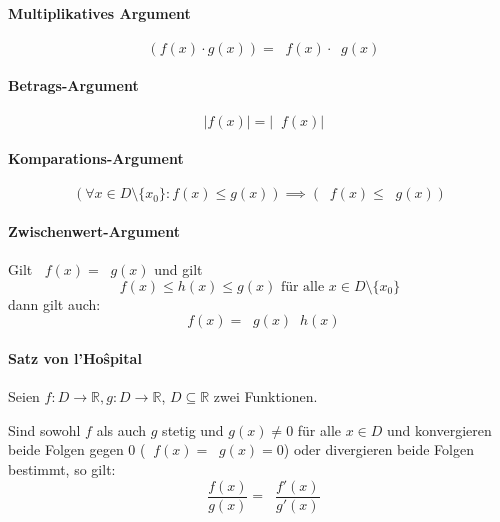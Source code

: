 \documentclass[a4paper, 11pt, accentcolor = tud3b]{tudreport}
\DeclareMathOperator{\limx}{\lim _ { x \rightarrow x _ 0 }}
\begin{document}
            \paragraph{Multiplikatives Argument}
                \[ \limx (f(x) \cdot g(x)) = \limx f(x) \cdot \limx g(x) \]

            \paragraph{Betrags-Argument}
                \[ \limx \lvert f(x) \rvert = \lvert \limx f(x) \rvert \]

            \paragraph{Komparations-Argument}
                \[ (\forall x \in D \setminus \{ x _ 0 \} : f(x) \leq g(x)) \implies (\limx f(x) \leq \limx g(x)) \]

            \paragraph{Zwischenwert-Argument}
                Gilt $ \limx f(x) = \limx g(x) $ und gilt
                \begin{equation*}
                    f(x) \leq h(x) \leq g(x) \text{ für alle } x \in D \setminus \{ x _ 0 \}
                \end{equation*}
                \indent dann gilt auch:
                \begin{equation*}
                    \limx f(x) = \limx g(x) \limx h(x)
                \end{equation*}

            \paragraph{Satz von l'Ho{\^s}pital}
                Seien $ f : D \rightarrow \mathbb{R}, g : D \rightarrow \mathbb{R} $, $ D \subseteq \mathbb{R} $ zwei Funktionen.

                Sind sowohl $ f $ als auch $ g $ stetig und $ g(x) \neq 0 $ für alle $ x \in D $ und konvergieren beide Folgen gegen $ 0 $ ($ \limx f(x) = \limx g(x) = 0 $) oder divergieren beide Folgen bestimmt, so gilt:
                \begin{equation*}
                    \limx \frac{f(x)}{g(x)} = \limx \frac{f'(x)}{g'(x)}
                \end{equation*}
\end{document}

